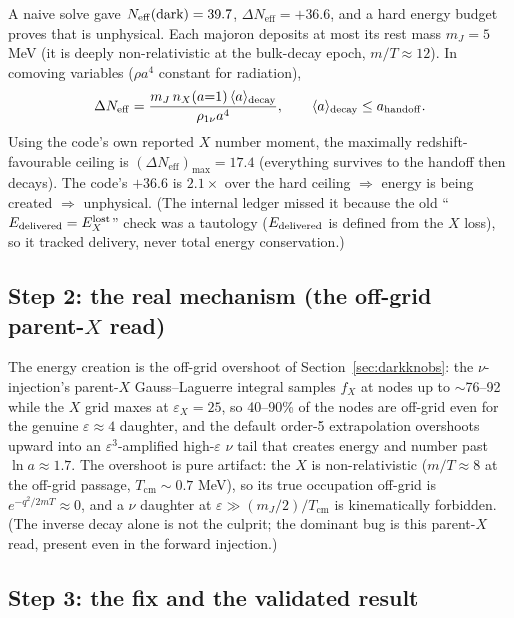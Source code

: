 \documentclass[11pt]{article}
\newcommand{\Neff}{N_{\mathrm{eff}}}
\newcommand{\Tcm}{T_{\mathrm{cm}}}
\newcommand{\eps}{\varepsilon}
\newcommand{\dNeff}{\Delta\Neff}
\begin{document}
A naive solve gave $\Neff(\rm dark)=39.7$, $\dNeff=+36.6$, and a hard
energy budget proves that is unphysical.  Each majoron deposits at most its rest
mass $m_J=5$ MeV (it is deeply non-relativistic at the bulk-decay epoch,
$m/T\approx12$).  In
comoving variables ($\rho a^4$ constant for radiation),
\begin{equation}
  \dNeff = \frac{m_J\,n_X(a{=}1)\,\langle a\rangle_{\rm decay}}
                {\rho_{1\nu}a^4},
  \qquad \langle a\rangle_{\rm decay}\le a_{\rm handoff}.
\end{equation}
Using the code's own reported $X$ number moment, the maximally
redshift-favourable ceiling is $(\dNeff)_{\max}=17.4$ (everything survives to the
handoff then decays).  The code's $+36.6$ is $2.1\times$ over the hard ceiling
$\Rightarrow$ energy is being created $\Rightarrow$ unphysical.  (The internal
ledger missed it because the old ``$E_{\rm delivered}=E_X^{\rm lost}$'' check was
a tautology ($E_{\rm delivered}$ is defined from the $X$ loss),
so it tracked delivery, never total energy conservation.)

\subsection{Step 2: the real mechanism (the off-grid parent-$X$ read)}

The energy creation is the off-grid overshoot of Section~\ref{sec:darkknobs}: the
$\nu$-injection's parent-$X$ Gauss--Laguerre integral samples $f_X$ at nodes up to
$\sim$76--92 while the $X$ grid maxes at $\eps_X=25$, so 40--90\% of the nodes are
off-grid even for the genuine $\eps\approx4$ daughter, and the default
order-5 extrapolation overshoots upward into an $\eps^3$-amplified high-$\eps$
$\nu$ tail that creates energy and number past $\ln a\approx1.7$.  The overshoot is
pure artifact: the $X$ is non-relativistic ($m/T\approx8$ at the off-grid
passage, $\Tcm\sim0.7$ MeV), so its true occupation
off-grid is $e^{-q^2/2mT}\approx0$, and a $\nu$ daughter at $\eps\gg(m_J/2)/\Tcm$ is
kinematically forbidden.  (The inverse decay alone is not the culprit; the
dominant bug is this parent-$X$ read, present even in the forward injection.)

\subsection{Step 3: the fix and the validated result}
\end{document}
